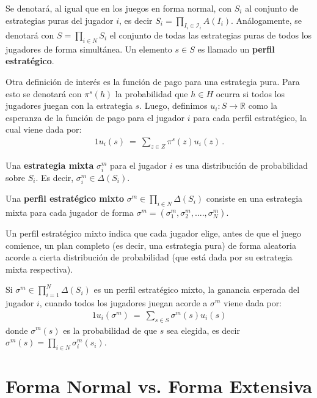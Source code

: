 Se denotará, al igual que en los juegos en forma normal, con $S_i$ al conjunto de estrategias puras del jugador $i$, es decir $S_i=\prod_{I_i \in \mathcal{I}_i} A(I_i)$. Análogamente, se denotará con $S = \prod_{i \in N} S_i$ el conjunto de todas las estrategias puras de todos los jugadores de forma simultánea. Un elemento $s \in S$ es llamado un \textbf{perfil estratégico}.

Otra definición de interés es la función de pago para una estrategia pura. Para esto se denotará con $\pi^s(h)$ la probabilidad que $h \in H $ ocurra si todos los jugadores juegan con la estrategia $s$. Luego, definimos $u_i : S \rightarrow \mathbb{R}$ como la esperanza de la función de pago para el jugador $i$ para cada perfil estratégico, la cual viene dada por:
\begin{alignat}{1}
\label{eq:funcion-pago-fe}
u_i(s)\ =\ \sum_{z \in Z} \pi^s(z) u_i(z) \,.
\end{alignat} 

\begin{definition}
\label{def:estrategia-mixta-fe}
Una \textbf{estrategia mixta} $\sigma^m_i$ para el jugador $i$ es una distribución de probabilidad sobre $S_i$. Es decir, $\sigma_i^m \in \Delta(S_i)$.
\end{definition}

\begin{definition}
Una \textbf{perfil estratégico mixto} $\sigma^m \in \prod_{i \in N} \Delta(S_i)$ consiste en una estrategia mixta para cada jugador de forma $\sigma^m = (\sigma_1^m, \sigma_2^m, ...., \sigma_N^m)$.
\end{definition}

Un perfil estratégico mixto indica que cada jugador elige, antes de que el juego comience, un plan completo (es decir, una estrategia pura) de forma aleatoria acorde a cierta distribución de probabilidad (que está dada por su estrategia mixta respectiva).

Si $\sigma^m \in \prod_{i = 1}^N \Delta(S_i)$ es un perfil estratégico mixto, la ganancia esperada del jugador $i$, cuando todos los jugadores juegan acorde a $\sigma^m$ viene dada por:
\begin{alignat}{1}
u_i(\sigma^m)\ =\ \sum_{s \in S} \sigma^m(s)u_i(s)
\end{alignat}
donde $\sigma^m(s)$ es la probabilidad de que $s$ sea elegida, es decir $\sigma^m(s) = \prod_{i \in N} \sigma_i^m(s_i)$.

\section{Forma Normal vs. Forma Extensiva}
\label{section:normal-extensiva}

